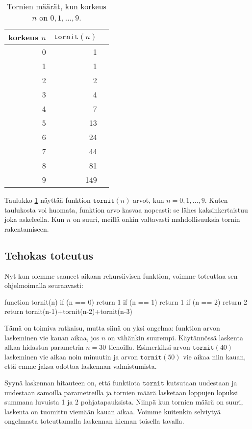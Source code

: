 \begin{table}
\center
\begin{tabular}{rrr}
korkeus $n$ & $\texttt{tornit}(n)$ \\
\hline
0 & 1 \\
1 & 1 \\
2 & 2 \\
3 & 4 \\
4 & 7 \\
5 & 13 \\
6 & 24 \\
7 & 44 \\
8 & 81 \\
9 & 149 \\
\end{tabular}
\caption{Tornien määrät, kun korkeus $n$ on $0,1,\dots,9$.}
\label{tab:dyntor}
\end{table}

Taulukko \ref{tab:dyntor} näyttää funktion
$\texttt{tornit}(n)$ arvot, kun $n=0,1,\dots,9$.
Kuten taulukosta voi huomata, funktion arvo kasvaa nopeasti:
se lähes kaksinkertaistuu joka askeleella.
Kun $n$ on suuri,
meillä onkin valtavasti mahdollisuuksia tornin rakentamiseen.

\subsection{Tehokas toteutus}

Nyt kun olemme saaneet aikaan rekursiivisen funktion,
voimme toteuttaa sen ohjelmoimalla seuraavasti:

\begin{code}
function tornit(n)
    if (n == 0) return 1
    if (n == 1) return 1
    if (n == 2) return 2
    return tornit(n-1)+tornit(n-2)+tornit(n-3)
\end{code}

Tämä on toimiva ratkaisu, mutta siinä on yksi ongelma:
funktion arvon laskeminen vie kauan aikaa, jos $n$ on
vähänkin suurempi.
Käytännössä laskenta alkaa hidastua parametrin $n=30$ tienoilla.
Esimerkiksi arvon $\texttt{tornit}(40)$ laskeminen vie aikaa
noin minuutin ja arvon $\texttt{tornit}(50)$ vie aikaa niin kauan,
että emme jaksa odottaa laskennan valmistumista.

Syynä laskennan hitauteen on, että funktiota $\texttt{tornit}$
kutsutaan uudestaan ja uudestaan samoilla parametreilla
ja tornien määrä lasketaan loppujen lopuksi summana
luvuista 1 ja 2 pohjatapauksista.
Niinpä kun tornien määrä on suuri,
laskenta on tuomittu viemään kauan aikaa.
Voimme kuitenkin selviytyä ongelmasta toteuttamalla
laskennan hieman toisella tavalla.

